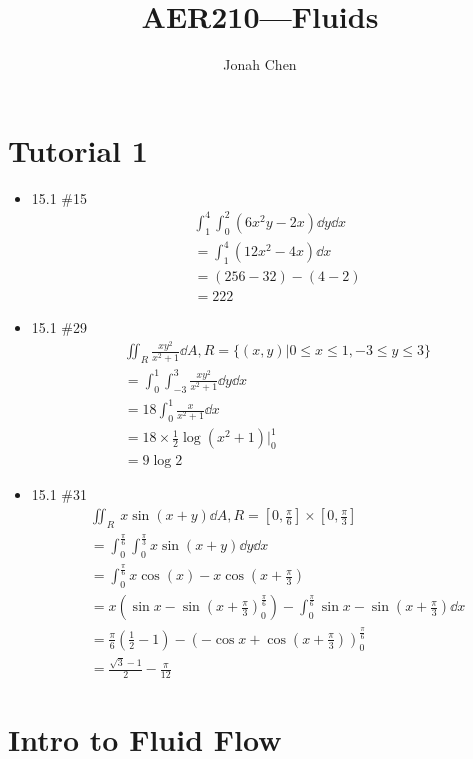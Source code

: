 \documentclass[a4paper]{article}
\title{AER210---Fluids}
\author{Jonah Chen}
\numberwithin{equation}{section}
\begin{document}
\sffamily
\maketitle
\tableofcontents

\section{Tutorial 1}

\begin{itemize}
    \item 15.1 \#15
    \begin{align}
        &\int_1^4\int_0^2(6x^2y-2x)\dd y\dd x\\
        &=\int_1^4(12x^2-4x)\dd x\\
        &=(256-32)-(4-2)\\
        &=222
    \end{align}
    \item 15.1 \#29
    \begin{align}
        &\iint_R \frac{xy^2}{x^2+1}\dd A, R=\{(x,y)|0\leq x\leq 1, -3\leq y\leq 3\}\\
        &=\int_0^1\int_{-3}^3\frac{xy^2}{x^2+1}\dd y\dd x\\
        &=18\int_0^1\frac{x}{x^2+1}\dd x\\
        &=18\times \frac{1}{2}\log(x^2+1)\Bigg|_0^1\\
        &=9\log 2
    \end{align}
    \item 15.1 \#31
    \begin{align}
        &\iint_R\ x\sin(x+y)\dd A, R=[0,\frac{\pi}{6}]\times[0,\frac{\pi}{3}]\\
        &=\int_0^{\frac{\pi}{6}}\int_0^{\frac{\pi}{3}}x\sin(x+y)\dd y\dd x\\
        &=\int_0^{\frac{\pi}{6}}x\cos(x)-x\cos(x+\frac{\pi}{3})\\
        &=x\left(\sin x-\sin(x+\frac{\pi}{3})_0^{\frac{\pi}{6}}\right)-\int_0^{\frac{\pi}{6}}\sin x-\sin(x+\frac{\pi}{3})\dd x\\
        &=\frac{\pi}{6}(\frac{1}{2}-1)-\left(-\cos x+\cos(x+\frac{\pi}{3})\right)_0^{\frac{\pi}{6}}\\
        &=\frac{\sqrt 3-1}{2}-\frac{\pi}{12}
    \end{align}

\end{itemize}

\section{Intro to Fluid Flow}
\end{document}
